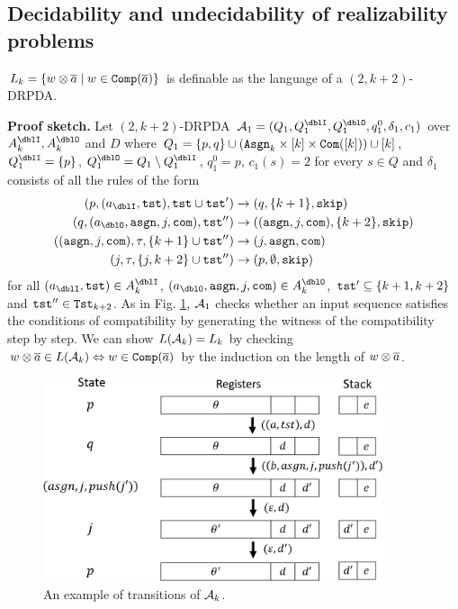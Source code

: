 \subsection{Decidability and undecidability of realizability problems}
\begin{lemma}\label{lem: Lk}
$L_k = \{w\otimes{\overline{a}} \mid w\in{\mathtt{Comp}}({\overline{a}})\}$ is definable as the language of a $(2,k+2)$-DRPDA.
\end{lemma}
{\bf Proof sketch.}\quad
Let $(2,k+2)$-DRPDA
$\calA_1=(Q_1, Q^\dblI_1, Q^\dblO_1, q^0_1, \delta_1, c_1)$
over $A_k^\dblI, A_k^\dblO$ and $D$ where
$Q_1=\{p, q\}\cup(\mathtt{Asgn}_k\times[k]\times\mathtt{Com}([k]))\cup[k]$, $Q^\dblI_1=\{p\}$, $Q^\dblO_1 = Q_1\setminus Q^\dblI_1$, $q^0_1 = p$,
$c_1(s)=2$ for every $s\in Q$ and $\delta_1$ consists of all the rules of the form
\begin{align}
(p, (a_\dblI, \tst), \tst\cup\tst')&\to(q, \{k+1\}, \skip)\label{eq: Lk1}\\
(q, (a_\dblO, \asgn, j, \com), \tst'')&\to((\asgn,j,\com), \{k+2\},\skip)\label{eq: Lk2}\\
((\asgn,j,\com), \tau, \{k+1\}\cup\tst'')&\to(j, \asgn, \com)\label{eq: Lk3}\\
(j, \tau, \{j, k+2\}\cup\tst'')&\to(p, \emptyset, \skip)\label{eq: Lk4}
\end{align}
for all $(a_\dblI, \tst)\in A_k^\dblI$, $(a_\dblO, \asgn, j, \com)\in A_k^\dblO$, $\mathtt{tst}'\subseteq \{k+1,k+2\}$ and $\mathtt{tst}''\in\mathtt{Tst}_{k+2}$.
As in Fig. \ref{fig: lem_Lk},
${\cal A}_1$ checks whether an input sequence satisfies the conditions of compatibility
by generating the witness of the compatibility step by step.
We can show $L({\cal A}_k)=L_k$
by checking $w\otimes{\overline{a}} \in L({\cal A}_k)\Leftrightarrow
w\in{\mathtt{Comp}}({\overline{a}})$ by the induction on the length of $w\otimes{\overline{a}}$.
\begin{figure}[t]
  \centering
  \includegraphics[width=10cm]{lem_Lk.png}
  \caption{An example of transitions of ${\cal A}_k$.}
  \label{fig: lem_Lk}
\end{figure}

